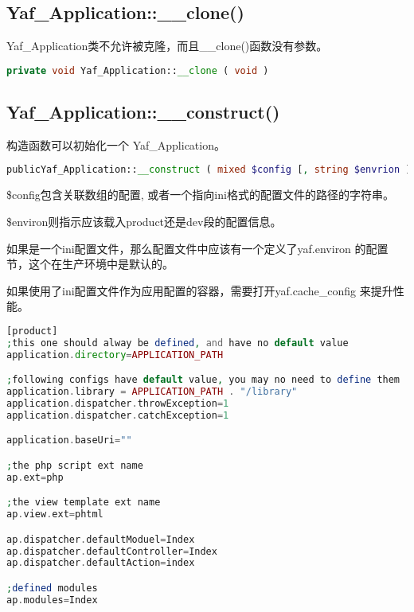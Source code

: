 \subsection{Yaf\_Application::\_\_clone()}

Yaf\_Application类不允许被克隆，而且\_\_clone()函数没有参数。






\begin{lstlisting}[language=PHP]
private void Yaf_Application::__clone ( void )
\end{lstlisting}





\subsection{Yaf\_Application::\_\_construct()}

构造函数可以初始化一个 Yaf\_Application。




\begin{lstlisting}[language=PHP]
publicYaf_Application::__construct ( mixed $config [, string $envrion ] )
\end{lstlisting}

\begin{compactitem}
\item \$config包含关联数组的配置, 或者一个指向ini格式的配置文件的路径的字符串。
\item \$environ则指示应该载入product还是dev段的配置信息。
\end{compactitem}




如果是一个ini配置文件，那么配置文件中应该有一个定义了yaf.environ 的配置节，这个在生产环境中是默认的。

如果使用了ini配置文件作为应用配置的容器，需要打开yaf.cache\_config 来提升性能。

\begin{lstlisting}[language=PHP]
[product]
;this one should alway be defined, and have no default value
application.directory=APPLICATION_PATH

;following configs have default value, you may no need to define them
application.library = APPLICATION_PATH . "/library"
application.dispatcher.throwException=1
application.dispatcher.catchException=1

application.baseUri=""

;the php script ext name
ap.ext=php

;the view template ext name
ap.view.ext=phtml

ap.dispatcher.defaultModuel=Index
ap.dispatcher.defaultController=Index
ap.dispatcher.defaultAction=index

;defined modules
ap.modules=Index
\end{lstlisting}



